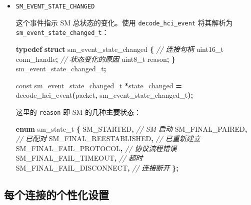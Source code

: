 \documentclass[
  12pt,
]{book}
\newenvironment{Shaded}{\begin{snugshade}}{\end{snugshade}}
\newcommand{\CommentTok}[1]{\textcolor[rgb]{0.56,0.35,0.01}{\textit{#1}}}
\newcommand{\DataTypeTok}[1]{\textcolor[rgb]{0.13,0.29,0.53}{#1}}
\newcommand{\KeywordTok}[1]{\textcolor[rgb]{0.13,0.29,0.53}{\textbf{#1}}}
\newcommand{\NormalTok}[1]{#1}
\newcommand{\OperatorTok}[1]{\textcolor[rgb]{0.81,0.36,0.00}{\textbf{#1}}}
\begin{document}
\begin{itemize}
\item
  \texttt{SM\_EVENT\_STATE\_CHANGED}

  这个事件指示 SM 总状态的变化。使用 \texttt{decode\_hci\_event} 将其解析为 \texttt{sm\_event\_state\_changed\_t}：

\begin{Shaded}
\begin{Highlighting}[]
\KeywordTok{typedef} \KeywordTok{struct}\NormalTok{ sm\_event\_state\_changed }\OperatorTok{\{}
  \CommentTok{// 连接句柄}
  \DataTypeTok{uint16\_t}\NormalTok{ conn\_handle}\OperatorTok{;}
  \CommentTok{// 状态变化的原因}
  \DataTypeTok{uint8\_t}\NormalTok{ reason}\OperatorTok{;}
\OperatorTok{\}}\NormalTok{ sm\_event\_state\_changed\_t}\OperatorTok{;}

\DataTypeTok{const}\NormalTok{ sm\_event\_state\_changed\_t }\OperatorTok{*}\NormalTok{state\_changed }\OperatorTok{=}
\NormalTok{  decode\_hci\_event}\OperatorTok{(}\NormalTok{packet}\OperatorTok{,}\NormalTok{ sm\_event\_state\_changed\_t}\OperatorTok{);}
\end{Highlighting}
\end{Shaded}

  这里的 \texttt{reason} 即 SM 的几种\textbf{主要}状态：

\begin{Shaded}
\begin{Highlighting}[]
\KeywordTok{enum}\NormalTok{ sm\_state\_t}
\OperatorTok{\{}
\NormalTok{  SM\_STARTED}\OperatorTok{,}                 \CommentTok{// SM 启动}
\NormalTok{  SM\_FINAL\_PAIRED}\OperatorTok{,}            \CommentTok{// 已配对}
\NormalTok{  SM\_FINAL\_REESTABLISHED}\OperatorTok{,}     \CommentTok{// 已重新建立}
\NormalTok{  SM\_FINAL\_FAIL\_PROTOCOL}\OperatorTok{,}     \CommentTok{// 协议流程错误}
\NormalTok{  SM\_FINAL\_FAIL\_TIMEOUT}\OperatorTok{,}      \CommentTok{// 超时}
\NormalTok{  SM\_FINAL\_FAIL\_DISCONNECT}\OperatorTok{,}   \CommentTok{// 连接断开}
\OperatorTok{\};}
\end{Highlighting}
\end{Shaded}
\end{itemize}

\hypertarget{ux6bcfux4e2aux8fdeux63a5ux7684ux4e2aux6027ux5316ux8bbeux7f6e}{%
\subsection{每个连接的个性化设置}\label{ux6bcfux4e2aux8fdeux63a5ux7684ux4e2aux6027ux5316ux8bbeux7f6e}}
\end{document}
